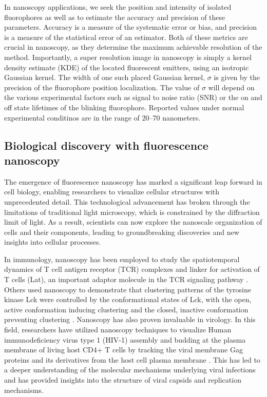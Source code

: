 In nanoscopy applications, we seek the position and intensity of isolated fluorophores as well as to estimate the accuracy and precision of these parameters. Accuracy is a measure of the systematic error or bias, and precision is a measure of the statistical error of an estimator. Both of these metrics are crucial in nanoscopy, as they determine the maximum achievable resolution of the method. Importantly, a super resolution image in nanoscopy is simply a kernel density estimate (KDE) of the located fluorescent emitters, using an isotropic Gaussian kernel. The width of one such placed Gaussian kernel, $\sigma$ is given by the precision of the fluorophore position localization. The value of $\sigma$ will depend on the various experimental factors such as signal to noise ratio (SNR) or the on and off state lifetimes of the blinking fluorophore. Reported values under normal experimental conditinos are in the range of 20–70 nanometers. 

\subsection{Biological discovery with fluorescence nanoscopy}

The emergence of fluorescence nanoscopy has marked a significant leap forward in cell biology, enabling researchers to visualize cellular structures with unprecedented detail. This technological advancement has broken through the limitations of traditional light microscopy, which is constrained by the diffraction limit of light. As a result, scientists can now explore the nanoscale organization of cells and their components, leading to groundbreaking discoveries and new insights into cellular processes.

In immunology, nanoscopy has been employed to study the spatiotemporal dynamics of T cell antigen receptor (TCR) complexes and linker for activation of T cells (Lat), an important adaptor molecule in the TCR signaling pathway \parencite{Lillemeier2010}. Others used nanoscopy to demonstrate that clustering patterns of the tyrosine kinase Lck were controlled by the conformational states of Lck, with the open, active conformation inducing clustering and the closed, inactive conformation preventing clustering \parencite{Rossy2013}. Nanoscopy has also proven invaluable in virology. In this field, researchers have utilized nanoscopy techniques to visualize Human immunodeficiency virus type 1 (HIV-1) assembly and budding at the plasma membrane of living host CD4+ T cells by tracking the viral membrane Gag proteins and its derivatives from the host cell plasma membrane \parencite{Floderer2018}. This has led to a deeper understanding of the molecular mechanisms underlying viral infections and has provided insights into the structure of viral capsids and replication mechanisms.


